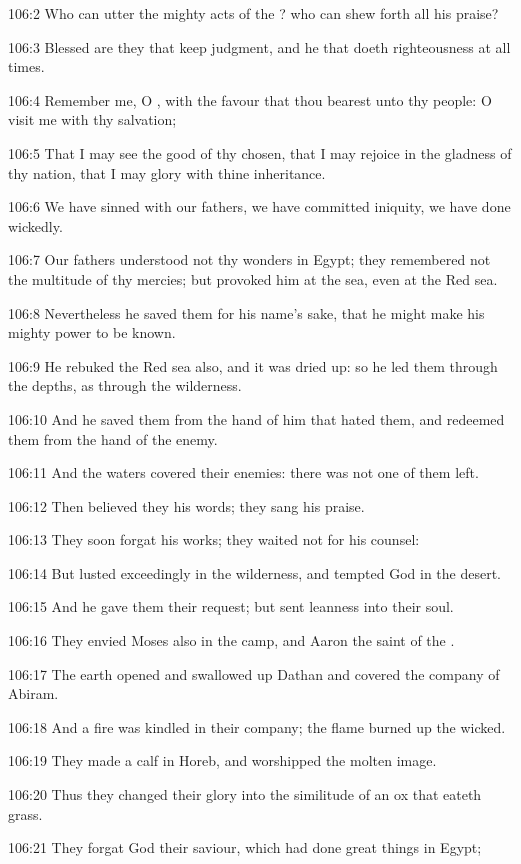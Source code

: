 106:2 Who can utter the mighty acts of the \LORD? who can shew forth
all his praise?

106:3 Blessed are they that keep judgment, and he that doeth
righteousness at all times.

106:4 Remember me, O \LORD, with the favour that thou bearest unto thy
people: O visit me with thy salvation;

106:5 That I may see the good of thy chosen, that I may rejoice in the
gladness of thy nation, that I may glory with thine inheritance.

106:6 We have sinned with our fathers, we have committed iniquity, we
have done wickedly.

106:7 Our fathers understood not thy wonders in Egypt; they remembered
not the multitude of thy mercies; but provoked him at the sea, even at
the Red sea.

106:8 Nevertheless he saved them for his name's sake, that he might
make his mighty power to be known.

106:9 He rebuked the Red sea also, and it was dried up: so he led them
through the depths, as through the wilderness.

106:10 And he saved them from the hand of him that hated them, and
redeemed them from the hand of the enemy.

106:11 And the waters covered their enemies: there was not one of them
left.

106:12 Then believed they his words; they sang his praise.

106:13 They soon forgat his works; they waited not for his counsel:

106:14 But lusted exceedingly in the wilderness, and tempted God in
the desert.

106:15 And he gave them their request; but sent leanness into their
soul.

106:16 They envied Moses also in the camp, and Aaron the saint of the
\LORD.

106:17 The earth opened and swallowed up Dathan and covered the
company of Abiram.

106:18 And a fire was kindled in their company; the flame burned up
the wicked.

106:19 They made a calf in Horeb, and worshipped the molten image.

106:20 Thus they changed their glory into the similitude of an ox that
eateth grass.

106:21 They forgat God their saviour, which had done great things in
Egypt;

